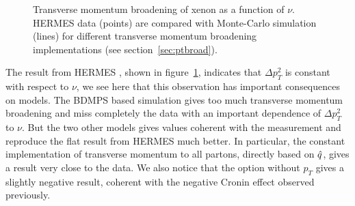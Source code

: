 \begin{figure}[tbp]
  \centering
{}
\caption {Transverse momentum broadening of xenon as a function of $\nu$. 
HERMES data \cite{Airapetian:2009jy} (points) are compared with Monte-Carlo 
simulation (lines) for different transverse momentum broadening implementations 
(see section~\ref{sec:ptbroad}).}
\label{fig:PtC-PtNu}
\end{figure}

The result from HERMES \cite{Airapetian:2009jy}, shown in figure~\ref{fig:PtC-PtNu}, indicates that $\Delta p_T^2$ is constant with respect to $\nu$, we see here that this observation has important consequences on models. The BDMPS based simulation gives too much transverse momentum broadening and miss completely the data with an important dependence of $\Delta p_T^2$ to $\nu$. But the two other models gives values coherent with the measurement and reproduce the flat result from HERMES much better. In particular, the constant implementation of transverse momentum to all partons, directly based on ${\hat q}$, gives a result very close to the data. We also notice that the option without $p_T$ gives a slightly negative result, coherent with the negative Cronin effect observed previously.


